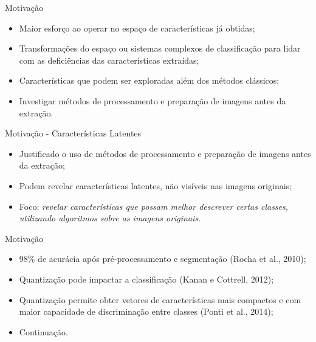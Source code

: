 \documentclass{beamer}
\begin{document}
\begin{frame}{Motivação}
\setlength\leftmargini{0em}
\justifying
\begin{itemize}
\item Maior esforço ao operar no espaço de características já obtidas;
\item Transformações do espaço ou sistemas complexos de classificação para lidar com as deficiências das características extraídas;
\item Características que podem ser exploradas além dos métodos clássicos;
\item Investigar métodos de processamento e preparação de imagens antes da extração.
\end{itemize}
\end{frame}
\begin{frame}{Motivação - Características Latentes}
\setlength\leftmargini{0em}
\justifying
{}
\begin{itemize}
\item Justificado o uso de métodos de processamento e preparação de imagens antes da extração;
\item Podem revelar características latentes, não visíveis nas imagens originais;
\item Foco: \emph{revelar características que possam melhor descrever certas classes, utilizando algoritmos sobre as imagens originais.}
\end{itemize}
\end{frame}
\begin{frame}{Motivação}
\setlength\leftmargini{0em}
\justifying
  \begin{itemize}
\justifying
    \item 98\% de acurácia após pré-processamento e segmentação (Rocha et al., 2010); %
    \item Quantização pode impactar a classificação (Kanan e Cottrell, 2012);
    \item Quantização permite obter vetores de características mais compactos e com maior capacidade de discriminação entre classes (Ponti et al., 2014);
    \item[]  {Continuação.}
  \end{itemize}
\end{frame}
\end{document}
